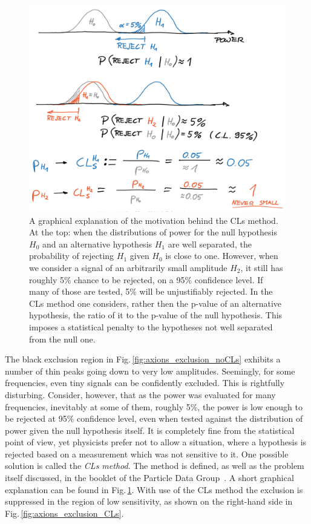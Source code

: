 
\begin{figure}
  \centering \includegraphics[width=0.7\linewidth]{gfx/axions/CLs.png}
  \caption{A graphical explanation of the motivation behind the CLs method. At the top: when the distributions of power for the null hypothesis $H_0$ and an alternative hypothesis $H_1$ are well separated, the probability of rejecting $H_1$ given $H_0$ is close to one. However, when we consider a signal of an arbitrarily small amplitude $H_2$, it still has roughly 5\% chance to be rejected, on a 95\% confidence level. If many of those are tested, 5\% will be unjustifiably rejected. In the CLs method one considers, rather then the p-value of an alternative hypothesis, the ratio of it to the p-value of the null hypothesis. This imposes a statistical penalty to the hypotheses not well separated from the null one.}\label{fig:CLs}
\end{figure}

The black exclusion region in Fig.\,\ref{fig:axions_exclusion_noCLs} exhibits a number of thin peaks going down to very low amplitudes. Seemingly, for some frequencies, even tiny signals can be confidently excluded. This is rightfully disturbing. Consider, however, that as the power was evaluated for many frequencies, inevitably at some of them, roughly 5\%, the power is low enough to be rejected at 95\% confidence level, even when tested against the distribution of power given the null hypothesis itself. It is completely fine from the statistical point of view, yet physicists prefer not to allow a situation, where a hypothesis is rejected based on a measurement which was not sensitive to it. One possible solution is called the \emph{CLs method}. The method is defined, as well as the problem itself discussed, in the booklet of the Particle Data Group~\citep{PDG2016}. A short graphical explanation can be found in Fig.\,\ref{fig:CLs}. With use of the CLs method the exclusion is suppressed in the region of low sensitivity, as shown on the right-hand side in Fig.\,\ref{fig:axions_exclusion_CLs}.

